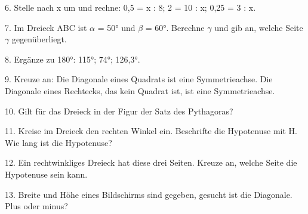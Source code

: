 \documentclass[11pt]{article}
\begin{document}
\begin{pfaufg}{}{6.}{}
Stelle nach x um und rechne: 0,5 = x : 8; 2 = 10 : x; 0,25 = 3 : x.
\end{pfaufg}
\begin{pfaufg}{}{7.}{}
Im Dreieck ABC ist $\alpha$ = 50° und $\beta$ = 60°. Berechne $\gamma$ und gib an, welche Seite $\gamma$ gegenüberliegt.
\end{pfaufg}
\begin{pfaufg}{}{8.}{}
Ergänze zu 180°: 115°; 74°; 126,3°.
\end{pfaufg}
\begin{pfaufg}{}{9.}{}
Kreuze an: Die Diagonale eines Quadrats ist eine Symmetrieachse. Die Diagonale eines Rechtecks, das kein Quadrat ist, ist eine Symmetrieachse.
\end{pfaufg}
\pfgruppe{}
\begin{pfaufg}{}{10.}{}
Gilt für das Dreieck in der Figur der Satz des Pythagoras? \janein
\par\smallskip\noindent {}\par
{}
\end{pfaufg}
\begin{pfaufg}{}{11.}{}
Kreise im Dreieck den rechten Winkel ein. Beschrifte die Hypotenuse mit H. Wie lang ist die Hypotenuse?
\par\smallskip\noindent {}\par
\par\noindent \leerfeld[cm] \par
{}
\end{pfaufg}
\begin{pfaufg}{}{12.}{}
Ein rechtwinkliges Dreieck hat diese drei Seiten. Kreuze an, welche Seite die Hypotenuse sein kann. 
\end{pfaufg}
\begin{pfaufg}{}{13.}{}
Breite und Höhe eines Bildschirms sind gegeben, gesucht ist die Diagonale. Plus oder minus? 
\end{pfaufg}
\end{document}

